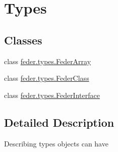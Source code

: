 \hypertarget{group__types}{}\section{Types}
\label{group__types}
\subsection*{Classes}
\begin{DoxyCompactItemize}
\item 
class \hyperlink{classfeder_1_1types_1_1FederArray}{feder.\+types.\+Feder\+Array}
\item 
class \hyperlink{classfeder_1_1types_1_1FederClass}{feder.\+types.\+Feder\+Class}
\item 
class \hyperlink{classfeder_1_1types_1_1FederInterface}{feder.\+types.\+Feder\+Interface}
\end{DoxyCompactItemize}


\subsection{Detailed Description}
Describing types objects can have 